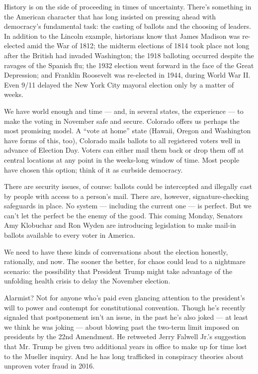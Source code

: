 History is on the side of proceeding in times of uncertainty. There's
something in the American character that has long insisted on pressing
ahead with democracy's fundamental task: the casting of ballots and the
choosing of leaders. In addition to the Lincoln example, historians know
that James Madison was re-elected amid the War of 1812; the midterm
elections of 1814 took place not long after the British had invaded
Washington; the 1918 balloting occurred despite the ravages of the
Spanish flu; the 1932 election went forward in the face of the Great
Depression; and Franklin Roosevelt was re-elected in 1944, during World
War II. Even 9/11 delayed the New York City mayoral election only by a
matter of weeks.

We have world enough and time --- and, in several states, the experience
--- to make the voting in November safe and secure. Colorado offers us
perhaps the most promising model. A ``vote at home'' state (Hawaii,
Oregon and Washington have forms of this, too), Colorado mails ballots
to all registered voters well in advance of Election Day. Voters can
either mail them back or drop them off at central locations at any point
in the weeks-long window of time. Most people have chosen this option;
think of it as curbside democracy.

There are security issues, of course: ballots could be intercepted and
illegally cast by people with access to a person's mail. There are,
however, signature-checking safeguards in place. No system --- including
the current one --- is perfect. But we can't let the perfect be the
enemy of the good. This coming Monday, Senators Amy Klobuchar and Ron
Wyden are introducing legislation to make mail-in ballots available to
every voter in America.

We need to have these kinds of conversations about the election
honestly, rationally, and now. The sooner the better, for chaos could
lead to a nightmare scenario: the possibility that President Trump might
take advantage of the unfolding health crisis to delay the November
election.

Alarmist? Not for anyone who's paid even glancing attention to the
president's will to power and contempt for constitutional convention.
Though he's recently signaled that postponement isn't an issue, in the
past he's also joked --- at least we think he was joking --- about
blowing past the two-term limit imposed on presidents by the 22nd
Amendment. He retweeted Jerry Falwell Jr.'s suggestion that Mr. Trump be
given two additional years in office to make up for time lost to the
Mueller inquiry. And he has long trafficked in conspiracy theories about
unproven voter fraud in 2016.

